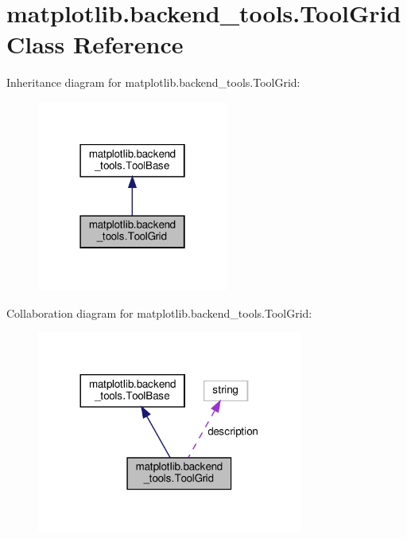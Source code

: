 \hypertarget{classmatplotlib_1_1backend__tools_1_1ToolGrid}{}\section{matplotlib.\+backend\+\_\+tools.\+Tool\+Grid Class Reference}
\label{classmatplotlib_1_1backend__tools_1_1ToolGrid}


Inheritance diagram for matplotlib.\+backend\+\_\+tools.\+Tool\+Grid\+:
\nopagebreak
\begin{figure}[H]
\begin{center}
\leavevmode
\includegraphics[width=178pt]{classmatplotlib_1_1backend__tools_1_1ToolGrid__inherit__graph}
\end{center}
\end{figure}


Collaboration diagram for matplotlib.\+backend\+\_\+tools.\+Tool\+Grid\+:
\nopagebreak
\begin{figure}[H]
\begin{center}
\leavevmode
\includegraphics[width=248pt]{classmatplotlib_1_1backend__tools_1_1ToolGrid__coll__graph}
\end{center}
\end{figure}
